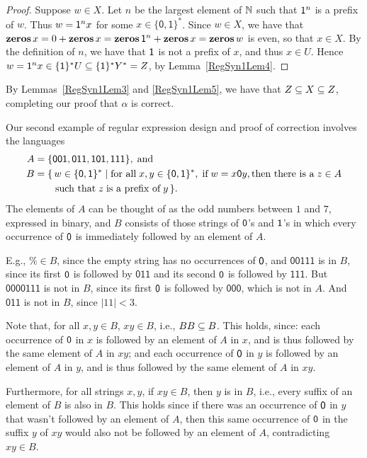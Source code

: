 \begin{proof}
Suppose $w\in X$.  Let $n$ be the largest element of $\mathbb{N}$ such that
$\mathsf{1}^n$ is a prefix of $w$.  Thus $w=\mathsf{1}^n x$ for some
$x\in\{\mathsf{0,1}\}^*$. Since $w\in X$, we have that $\mathbf{zeros}\,x = 0
+ \mathbf{zeros}\,x = \mathbf{zeros}\,\mathsf{1}^n + \mathbf{zeros}\,x = \mathbf{zeros}\,w$ is even, so
that $x\in X$.  By the definition of $n$, we have that $\mathsf{1}$
is not a prefix of $x$, and thus $x\in U$.  Hence $w=\mathsf{1}^n x\in
\{\mathsf{1}\}^* U\subseteq \{\mathsf{1}\}^*Y^* = Z$, by Lemma~\ref{RegSyn1Lem4}.
\end{proof}

By Lemmas~\ref{RegSyn1Lem3} and \ref{RegSyn1Lem5}, we have
that $Z\subseteq X\subseteq Z$, completing our proof that $\alpha$ is correct.

Our second example of regular expression design and proof
of correction involves the languages
\begin{align*}
A &=\{\mathsf{001, 011, 101, 111}\} , \;\allowbreak\mbox{and}\allowbreak\; \\
B &=\{\,w\in\{\mathsf{0,1}\}^* \mid \allowbreak\mbox{for all}\allowbreak\;x,y\in\{\mathsf{0,1}\}^*,
\;\allowbreak\mbox{if}\allowbreak\;w=x\mathsf{0} y, \allowbreak\mbox{then there is a}\allowbreak\; z\in A \\
&\quad\;\;\; \;\allowbreak\mbox{such that}\allowbreak\; z\;\allowbreak\mbox{is a prefix of}\allowbreak\; y\,\}.
\end{align*}
The elements of $A$ can be thought of as the odd numbers between $1$
and $7$, expressed in binary, and $B$ consists of those strings
of $\mathsf{0}$'s and $\mathsf{1}$'s in which every occurrence of $\mathsf{0}$
is immediately followed by an element of $A$.

E.g., $\%\in B$, since the empty string
has no occurrences of $\mathsf{0}$, and $\mathsf{00111}$ is in $B$, since
its first $\mathsf{0}$ is followed by $\mathsf{011}$ and its second
$\mathsf{0}$ is followed by $\mathsf{111}$.  But $\mathsf{0000111}$ is
not in $B$, since its first $\mathsf{0}$ is followed by $\mathsf{000}$,
which is not in $A$.  And $\mathsf{011}$ is not in $B$, since
$|11|<3$.

Note that, for all $x,y\in B$, $xy\in B$, i.e., $BB\subseteq B$.  This
holds, since: each occurrence of $\mathsf{0}$ in $x$ is followed by an
element of $A$ in $x$, and is thus followed by the same element of $A$
in $xy$; and each occurrence of $\mathsf{0}$ in $y$ is followed by an
element of $A$ in $y$, and is thus followed by the same element of $A$
in $xy$.

Furthermore, for all strings $x,y$, if $xy\in B$, then $y$ is in $B$,
i.e., every suffix of an element of $B$ is also in $B$.  This holds
since if there was an occurrence of $\mathsf{0}$ in $y$ that wasn't
followed by an element of $A$, then this same occurrence of $\mathsf{0}$
in the suffix $y$ of $xy$ would also not be followed by an element of
$A$, contradicting $xy\in B$.

